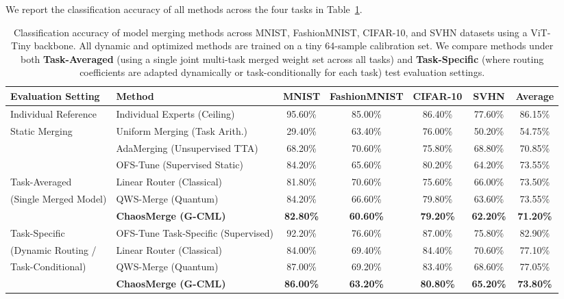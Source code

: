 We report the classification accuracy of all methods across the four tasks in Table~\ref{tab:main_results}.

\begin{table}[t]
\caption{Classification accuracy of model merging methods across MNIST, FashionMNIST, CIFAR-10, and SVHN datasets using a ViT-Tiny backbone. All dynamic and optimized methods are trained on a tiny 64-sample calibration set. We compare methods under both \textbf{Task-Averaged} (using a single joint multi-task merged weight set across all tasks) and \textbf{Task-Specific} (where routing coefficients are adapted dynamically or task-conditionally for each task) test evaluation settings.}
\label{tab:main_results}
\vskip 0.15in
\begin{center}
\begin{small}
\begin{sc}
\begin{tabular}{llccccc}
\toprule
Evaluation Setting & Method & MNIST & FashionMNIST & CIFAR-10 & SVHN & Average \\
\midrule
Individual Reference & Individual Experts (Ceiling)   & 95.60\% & 85.00\% & 86.40\% & 77.60\% & 86.15\% \\
\midrule
Static Merging & Uniform Merging (Task Arith.) & 29.40\% & 63.40\% & 76.00\% & 50.20\% & 54.75\% \\
& AdaMerging (Unsupervised TTA) & 68.20\% & 70.60\% & 75.80\% & 68.80\% & 70.85\% \\
& OFS-Tune (Supervised Static)  & 84.20\% & 65.60\% & 80.20\% & 64.20\% & 73.55\% \\
\midrule
Task-Averaged & Linear Router (Classical)      & 81.80\% & 70.60\% & 75.60\% & 66.00\% & 73.50\% \\
(Single Merged Model) & QWS-Merge (Quantum)            & 84.20\% & 66.60\% & 79.80\% & 63.60\% & 73.55\% \\
& \textbf{ChaosMerge (G-CML)}    & \textbf{82.80\%} & \textbf{60.60\%} & \textbf{79.20\%} & \textbf{62.20\%} & \textbf{71.20\%} \\
\midrule
Task-Specific & OFS-Tune Task-Specific (Supervised) & 92.20\% & 76.60\% & 87.00\% & 75.80\% & 82.90\% \\
(Dynamic Routing / & Linear Router (Classical)      & 84.00\% & 69.40\% & 84.40\% & 70.60\% & 77.10\% \\
Task-Conditional) & QWS-Merge (Quantum)            & 87.00\% & 69.20\% & 83.40\% & 68.60\% & 77.05\% \\
& \textbf{ChaosMerge (G-CML)}    & \textbf{86.00\%} & \textbf{63.20\%} & \textbf{80.80\%} & \textbf{65.20\%} & \textbf{73.80\%} \\
\bottomrule
\end{tabular}
\end{sc}
\end{small}
\end{center}
\vskip -0.1in
\end{table}


